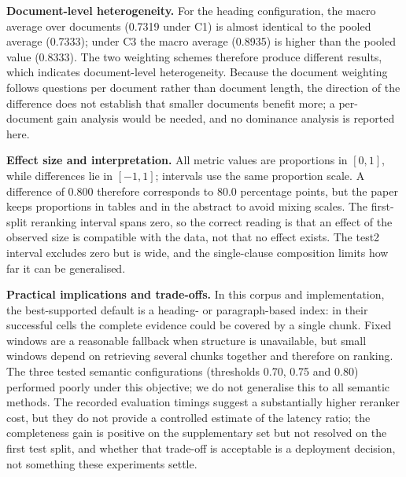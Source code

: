 \documentclass[conference]{IEEEtran}
\begin{document}
\textbf{Document-level heterogeneity.}
For the heading configuration, the macro average over documents (0.7319 under C1) is almost identical to the pooled average (0.7333); under C3 the macro average (0.8935) is higher than the pooled value (0.8333). The two weighting schemes therefore produce different results, which indicates document-level heterogeneity. Because the document weighting follows questions per document rather than document length, the direction of the difference does not establish that smaller documents benefit more; a per-document gain analysis would be needed, and no dominance analysis is reported here.

\textbf{Effect size and interpretation.}
All metric values are proportions in $[0,1]$, while differences lie in $[-1,1]$; intervals use the same proportion scale. A difference of 0.800 therefore corresponds to 80.0 percentage points, but the paper keeps proportions in tables and in the abstract to avoid mixing scales. The first-split reranking interval spans zero, so the correct reading is that an effect of the observed size is compatible with the data, not that no effect exists. The test2 interval excludes zero but is wide, and the single-clause composition limits how far it can be generalised.

\textbf{Practical implications and trade-offs.}
In this corpus and implementation, the best-supported default is a heading- or paragraph-based index: in their successful cells the complete evidence could be covered by a single chunk. Fixed windows are a reasonable fallback when structure is unavailable, but small windows depend on retrieving several chunks together and therefore on ranking. The three tested semantic configurations (thresholds 0.70, 0.75 and 0.80) performed poorly under this objective; we do not generalise this to all semantic methods. The recorded evaluation timings suggest a substantially higher reranker cost, but they do not provide a controlled estimate of the latency ratio; the completeness gain is positive on the supplementary set but not resolved on the first test split, and whether that trade-off is acceptable is a deployment decision, not something these experiments settle.
\end{document}
